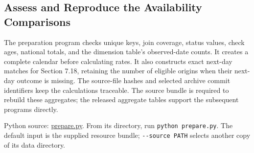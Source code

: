 \hypertarget{M02-assess-and-reproduce-the-availability-comparisons}{%
\subsection{Assess and Reproduce the Availability
Comparisons}\label{M02-assess-and-reproduce-the-availability-comparisons}}

\noindent \noindent The preparation program checks unique keys, join coverage,
status values, check ages, national totals, and the dimension table's
observed-date counts. It creates a complete calendar before calculating
rates. It also constructs exact next-day matches for Section 7.18,
retaining the number of eligible origins when their next-day outcome is
missing. The source-file hashes and selected archive commit identifiers
keep the calculations traceable. The source bundle is required to
rebuild these aggregates; the released aggregate tables support the
subsequent programs directly.

\FloatBarrier
{}
Python source:
\href{../03_Data_and_Code/McBroken/prepare.py}{prepare.py}. From its
directory, run \texttt{python\ prepare.py}. The default input is the
supplied resource bundle; \texttt{-\/-source\ PATH} selects another copy
of its data directory.


